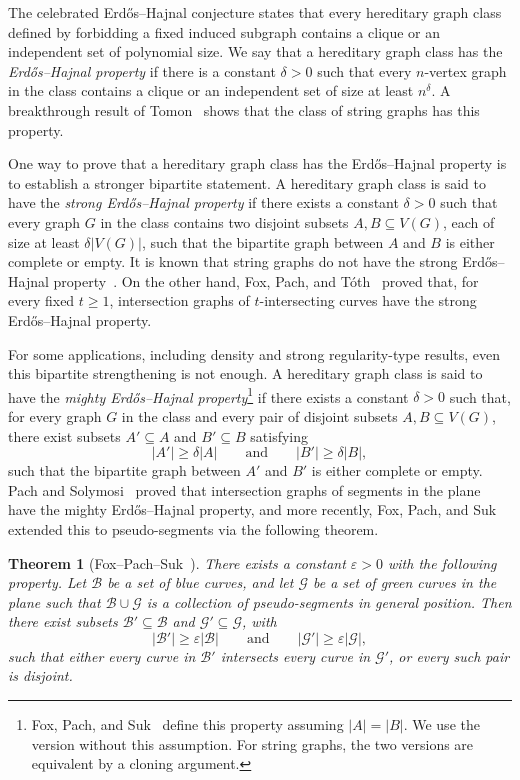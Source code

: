 \documentclass[11pt]{article}
\theoremstyle{plain}
\newtheorem{theorem}{Theorem}[section]
\theoremstyle{definition}
\theoremstyle{remark}
\begin{document}
The celebrated Erd\H{o}s--Hajnal conjecture states that every hereditary
graph class defined by forbidding a fixed induced subgraph contains a clique
or an independent set of polynomial size. We say that a hereditary graph class has the \emph{Erd\H{o}s--Hajnal
property} if there is a constant \(\delta>0\) such that every \(n\)-vertex
graph in the class contains a clique or an independent set of size at least
\(n^\delta\).  A breakthrough result of Tomon~\cite{Tomon} shows that the class of string graphs has this property.


One way to prove that a hereditary graph class has the
Erd\H{o}s--Hajnal property is to establish a stronger bipartite statement.
A hereditary graph class is said to have the \emph{strong
Erd\H{o}s--Hajnal property} if there exists a constant \(\delta>0\) such
that every graph \(G\) in the class contains two
disjoint subsets \(A,B\subseteq V(G)\), each of size at least
\(\delta|V(G)|\), such that the bipartite graph between \(A\) and \(B\) is
either complete or empty. It is known that string graphs do not have the
strong Erd\H{o}s--Hajnal property~\cite{Fox06,PT06}. On the other hand, Fox,
Pach, and T\'oth~\cite{FoxPachToth} proved that, for every fixed \(t\ge 1\),
intersection graphs of \(t\)-intersecting curves have the strong
Erd\H{o}s--Hajnal property.

For some applications, including density and strong regularity-type results, even this bipartite strengthening is not enough.  A
hereditary graph class is said to have the \emph{mighty
Erd\H{o}s--Hajnal property}\footnote{Fox, Pach, and Suk~\cite{FPS} define this property assuming
\(|A|=|B|\). We use the version without this assumption. For string graphs, the two versions are equivalent by a cloning argument.} if there
exists a constant \(\delta>0\) such that, for every graph \(G\) in the class
and every pair of disjoint subsets \(A,B\subseteq V(G)\), there exist
subsets \(A'\subseteq A\) and \(B'\subseteq B\) satisfying
\[
|A'|\ge \delta|A|
\qquad\text{and}\qquad
|B'|\ge \delta|B|,
\]
such that the bipartite graph between \(A'\) and \(B'\) is either complete
or empty.  Pach and
Solymosi~\cite{PachSolymosi} proved that intersection graphs of segments
in the plane have the mighty Erd\H{o}s--Hajnal property, and more recently,
Fox, Pach, and Suk~\cite{FPS} extended this to pseudo-segments via the following theorem.


\begin{theorem}[Fox--Pach--Suk~\cite{FPS}]
There exists a constant \(\varepsilon>0\) with the following property. Let
\(\mathcal B\) be a set of blue curves, and let \(\mathcal G\) be a set of
green curves in the plane such that \(\mathcal B\cup \mathcal G\) is a
collection of pseudo-segments in general position. Then there exist subsets
\(\mathcal B'\subseteq \mathcal B\) and \(\mathcal G'\subseteq \mathcal G\),
with
\[
|\mathcal B'|\ge \varepsilon|\mathcal B|
\qquad\text{and}\qquad
|\mathcal G'|\ge \varepsilon|\mathcal G|,
\]
such that either every curve in \(\mathcal B'\) intersects every curve in
\(\mathcal G'\), or every such pair is disjoint.
\end{theorem}
\end{document}
